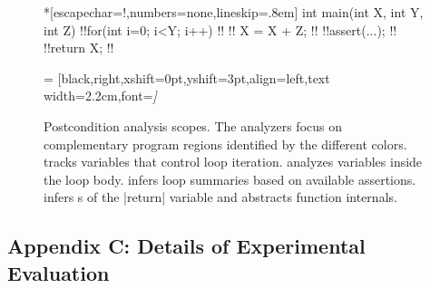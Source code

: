 \begin{figure}[H]
\begin{center}
\begin{minipage}{.7\textwidth}
\begin{outlisting}*[escapechar=!,numbers=none,lineskip=.8em]
int main(int X, int Y, int Z) {
    !!for(int i=0; i<Y; i++)              !!
    !!   X = X + Z;                       !!
    !!assert(...);                        !!
    !!return X;                           !!
}
\end{outlisting}
 = [black,right,xshift=0pt,yshift=3pt,align=left,text width=2.2cm,font=\itshape]
\end{minipage}
\end{center}
\caption[Postcondition analysis scopes]{
    Postcondition analysis scopes.
    The analyzers focus on complementary program regions identified by the different colors.
     tracks variables that control loop iteration.
    \impl analyzes variables inside the loop body.
     infers loop summaries based on available assertions.
     infers s of the \pr|return| variable and abstracts function internals.
}
\label{fig:comp-scope}
\end{figure}%

\subsection{Appendix C: Details of Experimental Evaluation}
\label{app:subsec:bench}

